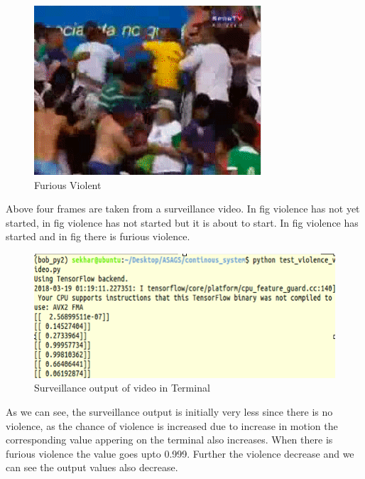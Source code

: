 \begin{figure}[H]
\centering
\includegraphics[scale = 0.5]{scene5.png}
\caption{Furious Violent}
\end{figure}
\par
Above four frames are taken from a surveillance video. In fig violence has not yet started, in fig  violence has not started but it is about to start. In fig violence has started and in fig there is furious violence.
\begin{figure}[H]
\centering
\includegraphics[width = \linewidth]{terminal_out.png}
\caption{Surveillance output of video in Terminal}
\end{figure}
As we can see, the surveillance output is initially very less since there is no violence, as the chance of violence is increased due to increase in motion the corresponding value appering on the terminal also increases. When there is furious violence the value goes upto 0.999. Further the violence decrease and we can see the output values also decrease.
